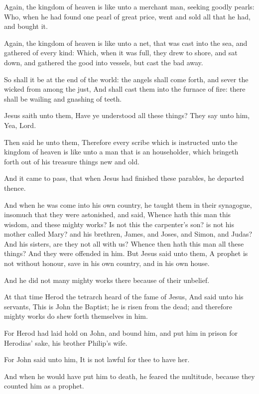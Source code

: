 \Verse Again, the kingdom of heaven is like unto a merchant man, seeking goodly pearls: \Verse Who, when he had found one pearl of great price, went and sold all that he had, and bought it.

\Verse Again, the kingdom of heaven is like unto a net, that was cast into the sea, and gathered of every kind: \Verse Which, when it was full, they drew to shore, and sat down, and gathered the good into vessels, but cast the bad away.

\Verse So shall it be at the end of the world: the angels shall come forth, and sever the wicked from among the just, \Verse And shall cast them into the furnace of fire: there shall be wailing and gnashing of teeth.

\Verse Jesus saith unto them, Have ye understood all these things? They say unto him, Yea, Lord.

\Verse Then said he unto them, Therefore every scribe which is instructed unto the kingdom of heaven is like unto a man that is an householder, which bringeth forth out of his treasure things new and old.

\Verse And it came to pass, that when Jesus had finished these parables, he departed thence.

\Verse And when he was come into his own country, he taught them in their synagogue, insomuch that they were astonished, and said, Whence hath this man this wisdom, and these mighty works?  \Verse Is not this the carpenter's son? is not his mother called Mary? and his brethren, James, and Joses, and Simon, and Judas?  \Verse And his sisters, are they not all with us? Whence then hath this man all these things?  \Verse And they were offended in him. But Jesus said unto them, A prophet is not without honour, save in his own country, and in his own house.

\Verse And he did not many mighty works there because of their unbelief.


\Chapter
\Verse At that time Herod the tetrarch heard of the fame of Jesus, \Verse And said unto his servants, This is John the Baptist; he is risen from the dead; and therefore mighty works do shew forth themselves in him.

\Verse For Herod had laid hold on John, and bound him, and put him in prison for Herodias' sake, his brother Philip's wife.

\Verse For John said unto him, It is not lawful for thee to have her.

\Verse And when he would have put him to death, he feared the multitude, because they counted him as a prophet.

